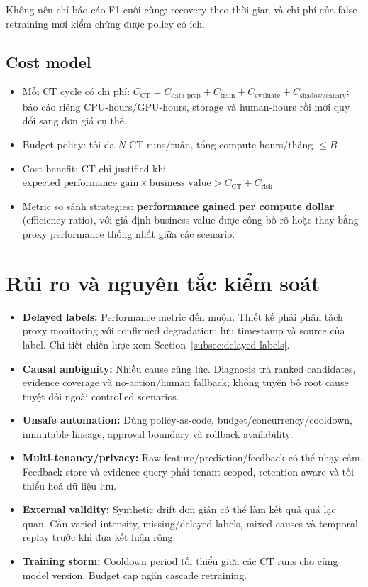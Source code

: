 \documentclass[11pt,a4paper]{article}
\begin{document}
Không nên chỉ báo cáo F1 cuối cùng: recovery theo thời gian và chi phí của false retraining mới kiểm chứng được policy có ích.

\subsection{Cost model}

\begin{itemize}
  \item Mỗi CT cycle có chi phí: $C_\text{CT} = C_\text{data\_prep} + C_\text{train} + C_\text{evaluate} + C_\text{shadow/canary}$; báo cáo riêng CPU-hours/GPU-hours, storage và human-hours rồi mới quy đổi sang đơn giá cụ thể.
  \item Budget policy: tối đa $N$ CT runs/tuần, tổng compute hours/tháng $\le B$
  \item Cost-benefit: CT chỉ justified khi $\text{expected\_performance\_gain} \times \text{business\_value} > C_\text{CT} + C_\text{risk}$
  \item Metric so sánh strategies: \textbf{performance gained per compute dollar} (efficiency ratio), với giả định business value được công bố rõ hoặc thay bằng proxy performance thống nhất giữa các scenario.
\end{itemize}

\section{Rủi ro và nguyên tắc kiểm soát}

\begin{itemize}
  \item \textbf{Delayed labels:} Performance metric đến muộn. Thiết kế phải phân tách proxy monitoring với confirmed degradation; lưu timestamp và source của label. Chi tiết chiến lược xem Section~\ref{subsec:delayed-labels}.
  \item \textbf{Causal ambiguity:} Nhiều cause cùng lúc. Diagnosis trả ranked candidates, evidence coverage và no-action/human fallback; không tuyên bố root cause tuyệt đối ngoài controlled scenarios.
  \item \textbf{Unsafe automation:} Dùng policy-as-code, budget/concurrency/cooldown, immutable lineage, approval boundary và rollback availability.
  \item \textbf{Multi-tenancy/privacy:} Raw feature/prediction/feedback có thể nhạy cảm. Feedback store và evidence query phải tenant-scoped, retention-aware và tối thiểu hoá dữ liệu lưu.
  \item \textbf{External validity:} Synthetic drift đơn giản có thể làm kết quả quá lạc quan. Cần varied intensity, missing/delayed labels, mixed causes và temporal replay trước khi đưa kết luận rộng.
  \item \textbf{Training storm:} Cooldown period tối thiểu giữa các CT runs cho cùng model version. Budget cap ngăn cascade retraining.
\end{itemize}
\end{document}
